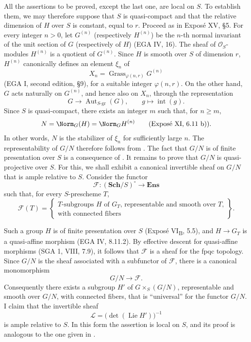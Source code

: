 All the assertions to be proved, except the last one, are local on
\(S\). To establish them, we may therefore suppose that \(S\) is
quasi-compact and that the relative dimension of \(H\) over \(S\)
is constant, equal to \(r\). Proceed as in Exposé XV, \S5. For every
integer \(n>0\), let \(G^{(n)}\) (respectively \(H^{(n)}\)) be the
\(n\)-th normal invariant of the unit section of \(G\)
(respectively of \(H\)) (EGA IV, 16). The sheaf of
\(\mathcal O_S\)-modules \(H^{(n)}\) is a quotient of \(G^{(n)}\).
Since \(H\) is smooth over \(S\) of dimension \(r\), \(H^{(n)}\)
canonically defines an element \(\xi_n\) of
\[
  X_n=\operatorname{Grass}_{\varphi(n,r)}G^{(n)}
\]
(EGA I, second edition, \S9), for a suitable integer
\(\varphi(n,r)\). On the other hand, \(G\) acts naturally on
\(G^{(n)}\), and hence also on \(X_n\), through the representation
\[
  G\longrightarrow\operatorname{Aut}_{S\text{-gr}}(G),
  \qquad g\longmapsto\operatorname{int}(g).
\]
Since \(S\) is quasi-compact, there exists an integer \(m\) such
that, for \(n\geq m\),
\[
  N=\Norm_G(H)=\Norm_G H^{(n)}
  \qquad\text{(Exposé XI, 6.11 b)).}
\]
In other words, \(N\) is the stabilizer of \(\xi_n\) for sufficiently
large \(n\). The representability of \(G/N\) therefore follows from
. The fact that \(G/N\) is of finite presentation over \(S\) is
a consequence of . It remains to prove that \(G/N\) is
quasi-projective over \(S\). For this, we shall exhibit a canonical
invertible sheaf on \(G/N\) that is ample relative to \(S\).
Consider the functor
\[
  \mathscr F:(\mathbf{Sch}/S)^\circ\longrightarrow\mathbf{Ens}
\]
such that, for every \(S\)-prescheme \(T\),
\[
  \mathscr F(T)=
  \left\{
  \begin{array}{c}
  \text{\(T\)-subgroups \(H\) of \(G_T\), representable and smooth
  over \(T\),}\\
  \text{with connected fibers}
  \end{array}
  \right\}.
\]

Such a group \(H\) is of finite presentation over \(S\)
(Exposé VI\textsubscript{B}, 5.5), and
\(H\to G_T\) is a quasi-affine morphism (EGA IV, 8.11.2).
By effective descent for quasi-affine morphisms (SGA 1, VIII, 7.9),
it follows that \(\mathscr F\) is a sheaf for the fpqc topology.
Since \(G/N\) is the sheaf associated with a subfunctor of
\(\mathscr F\), there is a canonical monomorphism
\[
  G/N\longrightarrow\mathscr F.
\]
Consequently there exists a subgroup \(H'\) of
\(G\times_S(G/N)\), representable and smooth over \(G/N\), with
connected fibers, that is ``universal'' for the functor \(G/N\).
I claim that the invertible sheaf
\[
  \mathscr L=\bigl(\det(\operatorname{Lie}H')\bigr)^{-1}
\]
is ample relative to \(S\). In this form the assertion is local on
\(S\), and its proof is analogous to the one given in .

